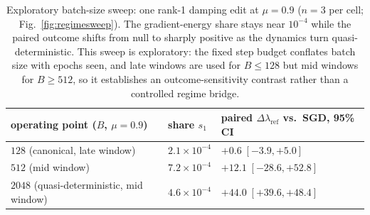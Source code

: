 \documentclass{article}
\theoremstyle{plain}
\theoremstyle{definition}
\theoremstyle{remark}
\newcommand{\lref}{\ensuremath{\lambda_{\mathrm{ref}}}}
\begin{document}
\begin{table}[!ht]
\centering
\small
\begin{tabular}{@{}lll@{}}
\toprule
operating point ($B$, $\mu{=}0.9$) & share $s_{1}$ & paired $\Delta\lref$ vs.\ SGD, 95\% CI \\
\midrule
$128$ (canonical, late window) & $2.1\!\times\!10^{-4}$ & $+0.6\;[-3.9,+5.0]$ \\
$512$ (mid window) & $7.2\!\times\!10^{-4}$ & $+12.1\;[-28.6,+52.8]$ \\
$2048$ (quasi-deterministic, mid window) & $4.6\!\times\!10^{-4}$ & $+44.0\;[+39.6,+48.4]$ \\
\bottomrule
\end{tabular}
\caption{Exploratory batch-size sweep: one rank-1 damping edit at $\mu{=}0.9$ ($n{=}3$ per cell; Fig.~\ref{fig:regimesweep}).
The gradient-energy share stays near
$10^{-4}$ while the paired outcome shifts from null to sharply positive
as the dynamics turn quasi-deterministic. This sweep is exploratory:
the fixed step budget conflates batch size with epochs seen, and late
windows are used for $B\le128$ but mid windows for $B\ge512$, so it
establishes an outcome-sensitivity contrast rather than a controlled
regime bridge.}
\label{tab:regimebridge}
\end{table}

\FloatBarrier
\end{document}
